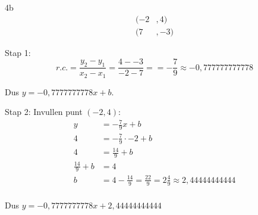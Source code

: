 \begin{antwoord}{4b}
\begin{align*}
 (-2 &, 4)\\
 (7 &, -3)
\end{align*}

Stap 1:
\[
 r.c. = \frac{y_2 - y_1}{x_2 - x_1} = \frac{4 -- 3}{-2 -7 } = 
 = -\frac{7}{9} \approx -0,777777777778
\]

Dus $y = -0,7777777778 x + b$.

Stap 2: Invullen punt $(-2, 4)$:
\begin{align*}
y &= -\frac{7}{9} x + b \\
4 &= -\frac{7}{9} \cdot -2 + b \\
4 &= \frac{14}{9} + b \\
\frac{14}{9} + b &= 4\\
b &= 4 - \frac{14}{9}  = \frac{22}{9} = 2\frac{4}{9} \approx 2,44444444444\\
\end{align*}

Dus $y = -0,7777777778 x + 2,44444444444 $
\end{antwoord}

